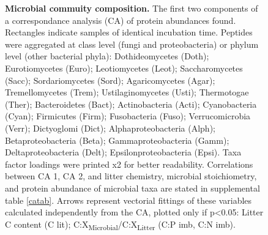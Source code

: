 \documentclass[10pt]{article}
\begin{document}
\begin{flushleft}
\begin{figure}[h!]
\vspace*{2mm}
\begin{center}
\end{center}
\caption{
{\bf Microbial commuity composition.} The first two components of a correspondance analysis (CA) of protein abundances found. Rectangles indicate samples of identical incubation time. Peptides were aggregated at class level (fungi and proteobacteria) or phylum level (other bacterial phyla): Dothideomycetes (Doth); Eurotiomycetes (Euro); Leotiomycetes (Leot); Saccharomycetes (Sacc); Sordariomycetes (Sord); Agaricomycetes (Agar); Tremellomycetes (Trem); Ustilaginomycetes (Usti); Thermotogae (Ther); Bacteroidetes (Bact); Actinobacteria (Acti); Cyanobacteria (Cyan); Firmicutes (Firm); Fusobacteria (Fuso); Verrucomicrobia (Verr); Dictyoglomi (Dict); Alphaproteobacteria (Alph); Betaproteobacteria (Beta); Gammaproteobacteria (Gamm); Deltaproteobacteria (Delt); Epsilonproteobacteria (Epsi). Taxa factor loadings were printed x2 for better readability. Correlations between CA 1, CA 2, and litter chemistry, microbial stoichiometry, and protein abundance of microbial taxa are stated in supplemental table \ref{catab}. 
Arrows represent vectorial fittings of these variables calculated independently from the CA, plotted only if p\textless 0.05: Litter C content (C lit); C:X\textsubscript{Microbial}/C:X\textsubscript{Litter} (C:P imb, C:N imb).}
\label{fig:metaprotpca}
\end{figure}


\end{flushleft}
\end{document}

